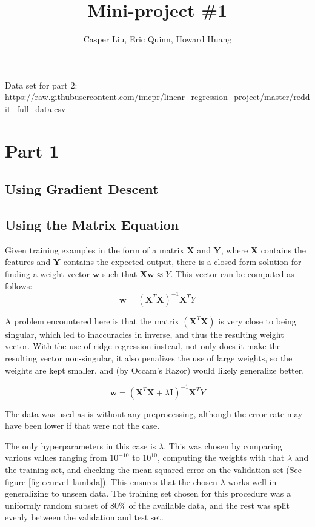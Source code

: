 \documentclass[10pt,twocolumn]{article}
\begin{document}
\title{Mini-project \#1}
\author{Casper Liu, Eric Quinn, Howard Huang}
\maketitle

Data set for part 2: \url{https://raw.githubusercontent.com/imcpr/linear_regression_project/master/reddit_full_data.csv}

\section{Part 1}
\subsection{Using Gradient Descent}

\subsection{Using the Matrix Equation}

Given training examples in the form of a matrix $\bm X$ and $\bm Y$, where $\bm X$ contains the features and $\bm Y$ contains the expected output, there is a closed form solution for finding a weight vector $\bm w$ such that $\bm X \bm w \approx Y$.
This vector can be computed as follows:
\[\bm w = (\bm X^T \bm X)^{-1}\bm X^T Y\]

A problem encountered here is that the matrix $(\bm X^T \bm X)$ is very close to being singular, which led to inaccuracies in inverse, and thus the resulting weight vector.
With the use of ridge regression instead, not only does it make the resulting vector non-singular, it also penalizes the use of large weights, so the weights are kept smaller, and (by Occam's Razor) would likely generalize better.

\[\bm w = (\bm X^T \bm X + \lambda \bm I)^{-1}\bm X^T Y\]

The data was used as is without any preprocessing, although the error rate may have been lower if that were not the case.

The only hyperparameters in this case is $\lambda$.
This was chosen by comparing various values ranging from $10^{-10}$ to $10^{10}$, computing the weights with that $\lambda$ and the training set, and checking the mean squared error on the validation set (See figure \ref{fig:ecurve1-lambda}).
This ensures that the chosen $\lambda$ works well in generalizing to unseen data.
The training set chosen for this procedure was a uniformly random subset of $80\%$ of the available data, and the rest was split evenly between the validation and test set.
\end{document}
